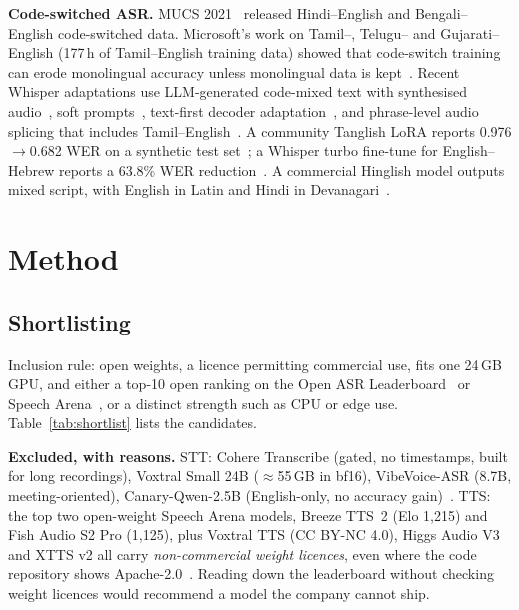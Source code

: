 \documentclass[conference]{IEEEtran}
\begin{document}
\textbf{Code-switched ASR.} MUCS 2021~\cite{diwan2021mucs} released Hindi--English and Bengali--English code-switched data. Microsoft's work on Tamil--, Telugu-- and Gujarati--English (177\,h of Tamil--English training data) showed that code-switch training can erode monolingual accuracy unless monolingual data is kept~\cite{shah2020cs,taskagnostic2020}. Recent Whisper adaptations use LLM-generated code-mixed text with synthesised audio~\cite{biswas2025hinglish}, soft prompts~\cite{yang2025spt}, text-first decoder adaptation~\cite{asyncswitch2025}, and phrase-level audio splicing that includes Tamil--English~\cite{seacs2025}. A community Tanglish LoRA reports 0.976$\rightarrow$0.682 WER on a synthetic test set~\cite{mc_tanglishlora}; a Whisper turbo fine-tune for English--Hebrew reports a 63.8\% WER reduction~\cite{hebrish}. A commercial Hinglish model outputs mixed script, with English in Latin and Hindi in Devanagari~\cite{mc_shunya}.

\section{Method}
\subsection{Shortlisting}
Inclusion rule: open weights, a licence permitting commercial use, fits one 24\,GB GPU, and either a top-10 open ranking on the Open ASR Leaderboard~\cite{openasrlb} or Speech Arena~\cite{aaspeecharena}, or a distinct strength such as CPU or edge use. Table~\ref{tab:shortlist} lists the candidates.

\textbf{Excluded, with reasons.} STT: Cohere Transcribe (gated, no timestamps, built for long recordings), Voxtral Small 24B ($\approx$55\,GB in bf16), VibeVoice-ASR (8.7B, meeting-oriented), Canary-Qwen-2.5B (English-only, no accuracy gain)~\cite{pinggystt}. TTS: the top two open-weight Speech Arena models, Breeze TTS~2 (Elo 1,215) and Fish Audio S2 Pro (1,125), plus Voxtral TTS (CC BY-NC 4.0), Higgs Audio V3 and XTTS v2 all carry \emph{non-commercial weight licences}, even where the code repository shows Apache-2.0~\cite{pinggytts}. Reading down the leaderboard without checking weight licences would recommend a model the company cannot ship.
\end{document}
